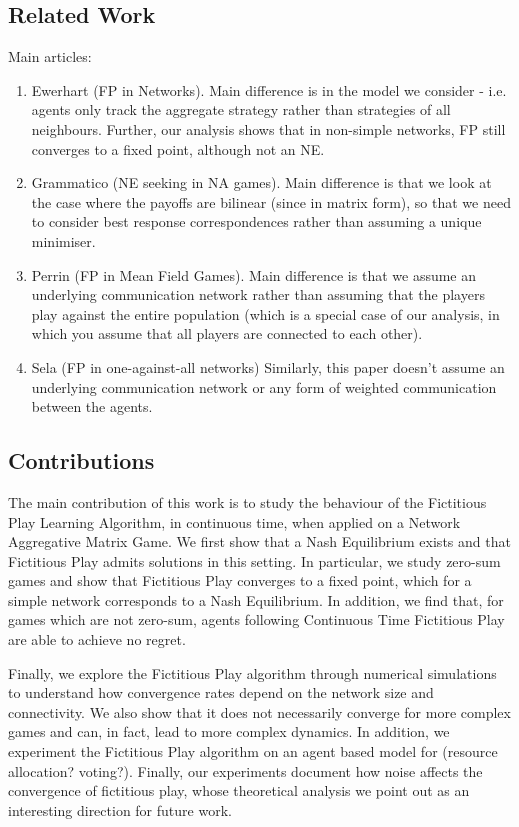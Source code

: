 \documentclass{article}
\theoremstyle{definition}
\begin{document}
		\subsection{Related Work}
		Main articles: 
		\begin{enumerate}
			\item Ewerhart (FP in Networks). Main difference is in the model we consider - i.e. agents only track the aggregate strategy rather than strategies of all neighbours. Further, our analysis shows that in non-simple networks, FP still converges to a fixed point, although not an NE.
			\item Grammatico (NE seeking in NA games). Main difference is that we look at the case where the payoffs are bilinear (since in matrix form), so that we need to consider best response correspondences rather than assuming a unique minimiser.
			\item Perrin (FP in Mean Field Games). Main difference is that we assume an underlying communication network rather than assuming that the players play against the entire population (which is a special case of our analysis, in which you assume that all players are connected to each other).
			\item Sela (FP in one-against-all networks) Similarly, this paper doesn't assume an underlying communication network or any form of weighted communication between the agents.
		\end{enumerate}

		\subsection{Contributions}

		The main contribution of this work is to study the behaviour of the Fictitious Play Learning Algorithm, in continuous time, when applied on a Network Aggregative Matrix Game. We first show that a Nash Equilibrium exists and that Fictitious Play admits solutions in this setting. In particular, we study zero-sum games and show that Fictitious Play converges to a fixed point, which for a simple network corresponds to a Nash Equilibrium. In addition, we find that, for games which are not zero-sum, agents following Continuous Time Fictitious Play are able to achieve no regret.

		Finally, we explore the Fictitious Play algorithm through numerical simulations to understand how convergence rates depend on the network size and connectivity. We also show that it does not necessarily converge for more complex games and can, in fact, lead to more complex dynamics. In addition, we experiment the Fictitious Play algorithm on an agent based model for (resource allocation? voting?). Finally, our experiments document how noise affects the convergence of fictitious play, whose theoretical analysis we point out as an interesting direction for future work.
\end{document}
